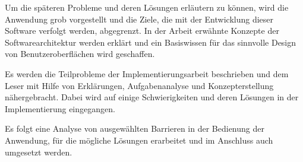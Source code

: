 Um die späteren Probleme und deren Lösungen erläutern zu können, wird die Anwendung grob vorgestellt und die Ziele, die mit der Entwicklung dieser Software verfolgt werden, abgegrenzt. In der Arbeit erwähnte Konzepte der Softwarearchitektur werden erklärt und ein Basiswissen für das sinnvolle Design von Benutzeroberflächen wird geschaffen.

Es werden die Teilprobleme der Implementierungsarbeit beschrieben und dem Leser mit Hilfe von Erklärungen, Aufgabenanalyse und Konzepterstellung nähergebracht. Dabei wird auf einige Schwierigkeiten und deren Lösungen in der Implementierung eingegangen.

Es folgt eine Analyse von ausgewählten Barrieren in der Bedienung der Anwendung, für die mögliche Lösungen erarbeitet und im Anschluss auch umgesetzt werden.
